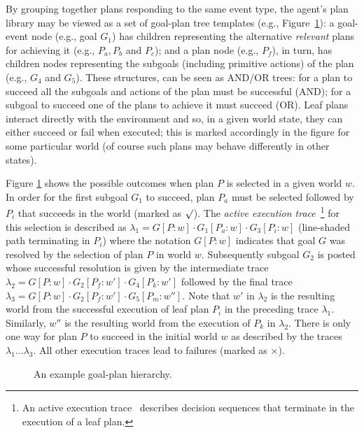 By grouping together plans responding to the same event type, the agent's plan library may be viewed as a set of goal-plan tree templates (e.g., Figure~\ref{fig:confidence}): a goal-event node (e.g., goal $G_1$) has children representing the alternative \emph{relevant} plans for achieving it (e.g., $P_a,P_b$ and $P_c$); and a plan node (e.g., $P_f$), in turn, has children nodes representing the subgoals (including primitive actions) of the plan (e.g., $G_4$ and $G_5$). These structures, can be seen as AND/OR trees: for a plan to succeed all the subgoals and actions of the plan must be successful (AND); for a subgoal to succeed one of the plans to achieve it must succeed (OR). Leaf plans interact directly with the environment and so, in a given world state, they can either succeed or fail when executed; this is marked accordingly in the figure for some particular world (of course such plans may behave differently in other states).


Figure \ref{fig:confidence} shows the possible outcomes when plan $P$ is selected in a given world $w$. In order for the first subgoal $G_1$ to succeed, plan $P_a$ must be selected followed by $P_i$ that succeeds in the world (marked as $\surd$). The {\em active execution trace}~\footnote{An active execution trace~\cite{singh10:learning} describes decision sequences that terminate in the execution of a leaf plan.} for this selection is described as $\lambda_1=G[P:w] \cdot G_1[P_a:w] \cdot G_3[P_i:w]$ (line-shaded path terminating in $P_i$) where the notation $G[P:w]$ indicates that goal $G$ was resolved by the selection of plan $P$ in world $w$. Subsequently subgoal $G_2$ is posted whose successful resolution is given by the intermediate trace $\lambda_2=G[P:w] \cdot G_2[P_f:w'] \cdot G_4[P_k:w']$ followed by the final trace $\lambda_3=G[P:w] \cdot G_2[P_f:w'] \cdot G_5[P_m:w'']$. Note that $w'$ in $\lambda_2$ is the resulting world from the successful execution of leaf plan $P_i$ in the preceding trace $\lambda_1$. Similarly, $w''$ is the resulting world from the execution of $P_k$ in $\lambda_2$. There is only one way for plan $P$ to succeed in the initial world $w$ as described by the traces $\lambda_1 \ldots \lambda_3$. All other execution traces lead to failures (marked as $\times$).

\begin{figure}[t]
\begin{center}
\resizebox{0.8\columnwidth}{!}{

}
\end{center}
\vskip -0.5cm
\caption{An example goal-plan hierarchy.}
\label{fig:confidence}
\end{figure}


